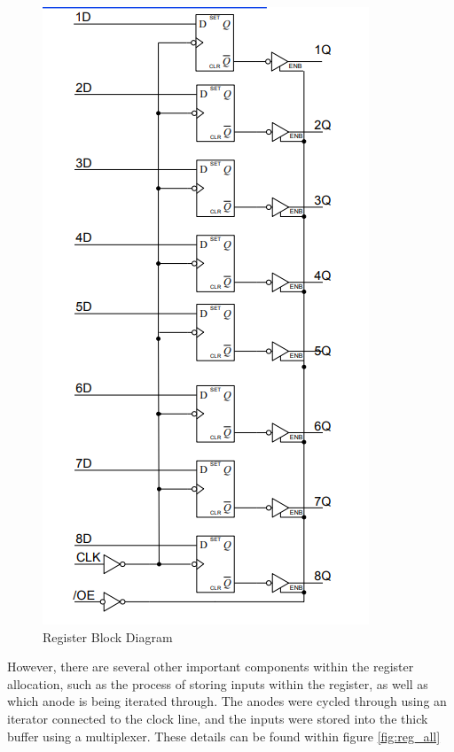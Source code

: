 \documentclass[12pt,a4paper]{article}
\begin{document}
\begin{figure}[H]
    \centering
    \includegraphics[scale=0.25]{images/register.png}
    \caption{Register Block Diagram}
    \label{fig:register}
\end{figure}

However, there are several other important components within the register allocation, such as the process of storing inputs within the register, as well as which anode is being iterated through. The anodes were cycled through using an iterator connected to the clock line, and the inputs were stored into the thick buffer using a multiplexer. These details can be found within figure \ref{fig:reg_all}
\end{document}
